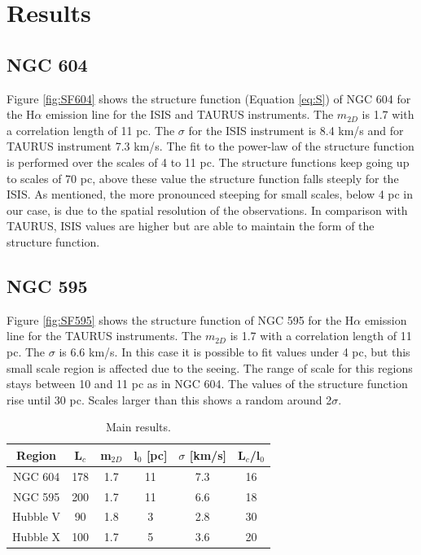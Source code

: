 \documentclass[fleqn,usenatbib]{mnras}
\begin{document}

\section{Results}\label{sec:res}

\subsection{NGC 604}

Figure \ref{fig:SF604} shows the structure function (Equation \ref{eq:S}) of NGC 604 for the H$\alpha$ emission line for the ISIS and TAURUS instruments. The $m_{2D}$ is 1.7 with a correlation length of 11 pc. The $\sigma$ for the ISIS instrument is 8.4 km/s and for TAURUS instrument 7.3 km/s. The fit to the power-law of the structure function is performed over the scales of 4 to 11 pc. The structure functions keep going up to scales of 70 pc, above these value the structure function falls steeply for the ISIS. As \cite{arthur2016turbulence} mentioned, the more pronounced steeping for small scales, below 4 pc in our case, is due to the spatial resolution of the observations. In comparison with TAURUS, ISIS values are higher but are able to maintain the form of the structure function. 

\subsection{NGC 595}

Figure \ref{fig:SF595} shows the structure function of NGC 595 for the H$\alpha$ emission line for the TAURUS instruments. The $m_{2D}$ is 1.7 with a correlation length of 11 pc. The $\sigma$ is 6.6 km/s. In this case it is possible to fit values under 4 pc, but this small scale region is affected due to the seeing. The range of scale for this regions stays between 10 and 11 pc as in NGC 604. The values of the structure function rise until 30 pc. Scales larger than this shows a random around 2$\sigma$.

\begin{table}
\begin{center}\caption{Main results.}
\begin{tabular}{cccccc}\hline
Region   & L$_{c}$  & m$_{2D}$  & l$_{0}$ [pc] & $\sigma$ [km/s] & L$_{c}$/l$_{0}$ \\\hline
NGC 604 & 178  &     1.7   &     11       &    7.3        & 16 	\\
NGC 595 & 200  &     1.7   &     11      &    6.6        & 18 	\\
Hubble V & 90  &     1.8   &     3       &    2.8      & 30 	\\
Hubble X & 100  &     1.7   &     5       &    3.6      & 20 	\\
\end{tabular}\label{tab:Res}
\end{center}
\end{table} 
\end{document}

